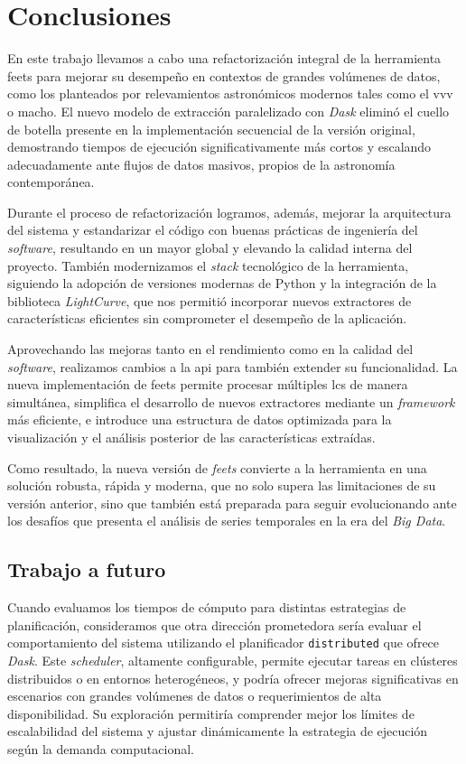 \chapter{Conclusiones}
\label{chapter:conclusiones}

En este trabajo llevamos a cabo una refactorización integral de la herramienta \gls{feets} para mejorar su desempeño en contextos de grandes volúmenes de datos, como los planteados por relevamientos astronómicos modernos tales como el \gls{vvv} o \gls{macho}. El nuevo modelo de extracción paralelizado con \textit{Dask} eliminó el cuello de botella presente en la implementación secuencial de la versión original, demostrando tiempos de ejecución significativamente más cortos y escalando adecuadamente ante flujos de datos masivos, propios de la astronomía contemporánea.

Durante el proceso de refactorización logramos, además, mejorar la arquitectura del sistema y estandarizar el código con buenas prácticas de ingeniería del \emph{software}, resultando en un mayor  global y elevando la calidad interna del proyecto. También modernizamos el \emph{stack} tecnológico de la herramienta, siguiendo la adopción de versiones modernas de Python y la integración de la biblioteca \textit{LightCurve}, que nos permitió incorporar nuevos extractores de características eficientes sin comprometer el desempeño de la aplicación.

Aprovechando las mejoras tanto en el rendimiento como en la calidad del \emph{software}, realizamos cambios a la \gls{api} para también extender su funcionalidad. La nueva implementación de \gls{feets} permite procesar múltiples \glspl{lc} de manera simultánea, simplifica el desarrollo de nuevos extractores mediante un \emph{framework} más eficiente, e introduce una estructura de datos optimizada para la visualización y el análisis posterior de las características extraídas.

Como resultado, la nueva versión de \textit{feets} convierte a la herramienta en una solución robusta, rápida y moderna, que no solo supera las limitaciones de su versión anterior, sino que también está preparada para seguir evolucionando ante los desafíos que presenta el análisis de series temporales en la era del \emph{Big Data}.

\section{Trabajo a futuro}

Cuando evaluamos los tiempos de cómputo para distintas estrategias de planificación, consideramos que otra dirección prometedora sería evaluar el comportamiento del sistema utilizando el planificador \texttt{distributed} que ofrece \textit{Dask}. Este \emph{scheduler}, altamente configurable, permite ejecutar tareas en clústeres distribuidos o en entornos heterogéneos, y podría ofrecer mejoras significativas en escenarios con grandes volúmenes de datos o requerimientos de alta disponibilidad. Su exploración permitiría comprender mejor los límites de escalabilidad del sistema y ajustar dinámicamente la estrategia de ejecución según la demanda computacional.

